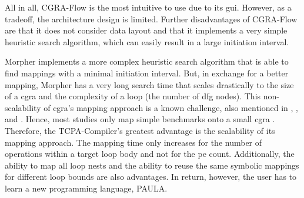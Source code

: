 All in all, CGRA-Flow is the most intuitive to use due to its \ac{gui}.
However, as a tradeoff, the architecture design is limited.
Further disadvantages of CGRA-Flow are that it does not consider data layout and that it implements a very simple heuristic search algorithm, which can easily result in a large initiation interval.

Morpher implements a more complex heuristic search algorithm that is able to find mappings with a minimal initiation interval.
But, in exchange for a better mapping, Morpher has a very long search time that scales drastically to the size of a \ac{cgra} and the complexity of a loop (\ie the number of \ac{dfg} nodes).
This non-scalability of \ac{cgra}'s mapping approach is a known challenge, also mentioned in \cite{36_survey_mapping_approach}, \cite{19_CGRA}, and \cite{18_himap}.
Hence, most studies only map simple benchmarks onto a small \ac{cgra} \cite{19_CGRA}.
Therefore, the TCPA-Compiler's greatest advantage is the scalability of its mapping approach.
The mapping time only increases for the number of operations within a target loop body and not for the \ac{pe} count.
Additionally, the ability to map all loop nests and the ability to reuse the same symbolic mappings for different loop bounds are also advantages.
In return, however, the user has to learn a new programming language, PAULA.

